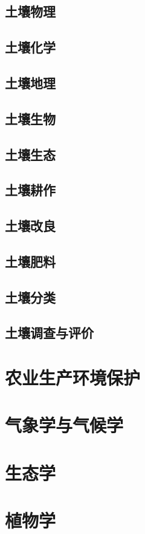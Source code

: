 \documentclass[UTF8]{../ApplicationUniverse}
\begin{document}
    \subsection{土壤物理}
    \subsection{土壤化学}
    \subsection{土壤地理}
    \subsection{土壤生物}
    \subsection{土壤生态}
    \subsection{土壤耕作}
    \subsection{土壤改良}
    \subsection{土壤肥料}
    \subsection{土壤分类}
    \subsection{土壤调查与评价}


\section{农业生产环境保护}
\section{气象学与气候学}
\section{生态学}
\section{植物学}
\end{document}
